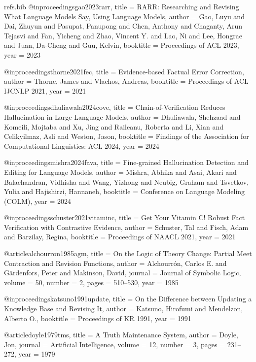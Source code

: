 \begin{filecontents*}[overwrite]{refs.bib}
@inproceedings{gao2023rarr,
  title     = {{RARR}: Researching and Revising What Language Models Say, Using Language Models},
  author    = {Gao, Luyu and Dai, Zhuyun and Pasupat, Panupong and Chen, Anthony and Chaganty, Arun Tejasvi and Fan, Yicheng and Zhao, Vincent Y. and Lao, Ni and Lee, Hongrae and Juan, Da-Cheng and Guu, Kelvin},
  booktitle = {Proceedings of ACL 2023},
  year      = {2023}
}

@inproceedings{thorne2021fec,
  title     = {Evidence-based Factual Error Correction},
  author    = {Thorne, James and Vlachos, Andreas},
  booktitle = {Proceedings of ACL-IJCNLP 2021},
  year      = {2021}
}

@inproceedings{dhuliawala2024cove,
  title     = {Chain-of-Verification Reduces Hallucination in Large Language Models},
  author    = {Dhuliawala, Shehzaad and Komeili, Mojtaba and Xu, Jing and Raileanu, Roberta and Li, Xian and Celikyilmaz, Asli and Weston, Jason},
  booktitle = {Findings of the Association for Computational Linguistics: ACL 2024},
  year      = {2024}
}

@inproceedings{mishra2024fava,
  title     = {Fine-grained Hallucination Detection and Editing for Language Models},
  author    = {Mishra, Abhika and Asai, Akari and Balachandran, Vidhisha and Wang, Yizhong and Neubig, Graham and Tsvetkov, Yulia and Hajishirzi, Hannaneh},
  booktitle = {Conference on Language Modeling (COLM)},
  year      = {2024}
}

@inproceedings{schuster2021vitaminc,
  title     = {Get Your Vitamin {C}! Robust Fact Verification with Contrastive Evidence},
  author    = {Schuster, Tal and Fisch, Adam and Barzilay, Regina},
  booktitle = {Proceedings of NAACL 2021},
  year      = {2021}
}

@article{alchourron1985agm,
  title   = {On the Logic of Theory Change: Partial Meet Contraction and Revision Functions},
  author  = {Alchourr{\'o}n, Carlos E. and G{\"a}rdenfors, Peter and Makinson, David},
  journal = {Journal of Symbolic Logic},
  volume  = {50},
  number  = {2},
  pages   = {510--530},
  year    = {1985}
}

@inproceedings{katsuno1991update,
  title     = {On the Difference between Updating a Knowledge Base and Revising It},
  author    = {Katsuno, Hirofumi and Mendelzon, Alberto O.},
  booktitle = {Proceedings of KR 1991},
  year      = {1991}
}

@article{doyle1979tms,
  title   = {A Truth Maintenance System},
  author  = {Doyle, Jon},
  journal = {Artificial Intelligence},
  volume  = {12},
  number  = {3},
  pages   = {231--272},
  year    = {1979}
}


\end{filecontents*}

